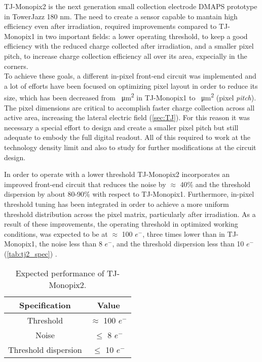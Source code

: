 TJ-Monopix2 is the next generation small collection electrode DMAPS prototype in TowerJazz 180 nm. The need to create a sensor capable to mantain high efficiency even after irradiation, required improvements compared to TJ-Monopix1 in two important fields: a lower operating threshold,  to keep a good efficiency with the reduced charge collected after irradiation, and a smaller pixel pitch, to increase charge collection efficiency all over its area, expecially in the corners.\\

To achieve these goals, a different in-pixel front-end circuit was implemented and a lot of efforts have been focused on optimizing pixel layout in order to reduce its size, which has been decreased from ~\unit{\micro m^{2}} in TJ-Monopix1 to ~\unit{\micro m^{2}} (pixel \textit{pitch}). The pixel dimensions are critical to accomplish faster charge collection across all active area, increasing the lateral electric field (\autoref{sec:TJ}). For this reason it was necessary a special effort to design and create a smaller pixel pitch but still adequate to embody the full digital readout. All of this required to work at the technology density limit and also to study for further modifications at the circuit design.

In order to operate with a lower threshold TJ-Monopix2 incorporates an improved front-end circuit that reduces the noise by $\approx$ 40\% and the threshold dispersion by about 80-90\% with respect to TJ-Monopix1. Furthermore, in-pixel threshold tuning has been integrated in order to achieve a more uniform threshold distribution across the pixel matrix, particularly after irradiation. As a result of these improvements, the operating threshold in optimized working conditions, was expected to be at $\approx$ 100 $e^{-}$, three times lower than in TJ-Monopix1, the noise less than 8 $e^{-}$, and the threshold dispersion less than 10 $e^{-}$ (\autoref{tab:tj2_spec}) \cite{Moustakas:2021gjr}. 

\medskip

\begin{table}[h!]
\centering
\begin{tabular}{c|c}
\hline
Specification & Value \\
\hline
\hline
Threshold & $\approx$ 100 $e^{-}$\\
\hline
Noise & $\leq$ 8 $e^{-}$ \\ 
\hline
Threshold dispersion & $\leq$ 10 $e^{-}$\\
\hline
\hline
\end{tabular}
\caption{Expected performance of TJ-Monopix2.}
\label{tab:tj2_spec}
\end{table}



